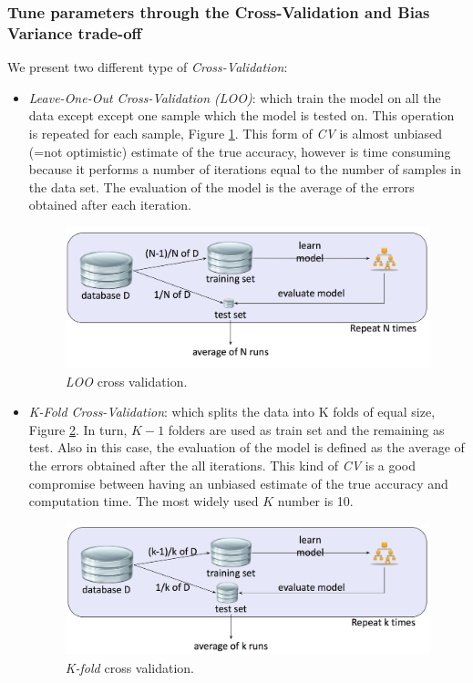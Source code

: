 \subsubsection*{Tune parameters through the Cross-Validation and Bias Variance trade-off}

We present two different type of \emph{Cross-Validation}:
\begin{itemize}
\item \emph{Leave-One-Out Cross-Validation (LOO)}: which train the model on all the data except except one sample which the model is tested on. This operation is repeated for each sample, Figure \ref{pic:loo}. This form of \emph{CV}  is almost unbiased (=not optimistic) estimate of the true accuracy, however is time consuming because it performs a number of iterations equal to the number of samples in the data set. The evaluation of the model is the average of the errors obtained after each iteration.

\begin{figure}[H]%
 \centering
 \includegraphics[width=13cm]{./img/08/loo}
 \caption{\label{pic:loo} \emph{LOO} cross validation.}
\end{figure}

\item \emph{K-Fold Cross-Validation}: which splits the data into K folds of equal size, Figure \ref{pic:kfold}. In turn, $K-1$ folders are used as train set and the remaining as test. Also in this case, the evaluation of the model is defined as the average of the errors obtained after the all iterations. This kind of \emph{CV} is a good compromise between having an unbiased estimate of the true accuracy and computation time. The most widely used $K$ number is 10.

\begin{figure}[H]%
 \centering
 \includegraphics[width=13cm]{./img/08/kfold}
 \caption{\label{pic:kfold} \emph{K-fold} cross validation.}
\end{figure}

\end{itemize}


